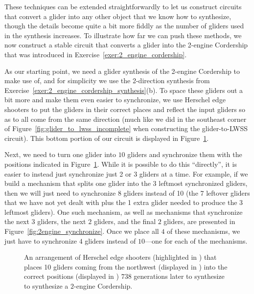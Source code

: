 These techniques can be extended straightforwardly to let us construct circuits that convert a glider into any other object that we know how to synthesize, though the details become quite a bit more fiddly as the number of gliders used in the synthesis increases. To illustrate how far we can push these methods, we now construct a stable circuit that converts a glider into the 2-engine Cordership that was introduced in Exercise~\ref{exer:2_engine_cordership}.

As our starting point, we need a glider synthesis of the 2-engine Cordership to make use of, and for simplicity we use the 2-direction synthesis from Exercise~\ref{exer:2_engine_cordership_synthesis}(b). To space these gliders out a bit more and make them even easier to synchronize, we use Herschel edge shooters to put the gliders in their correct places and reflect the input gliders so as to all come from the same direction (much like we did in the southeast corner of Figure~\ref{fig:glider_to_lwss_incomplete} when constructing the glider-to-LWSS circuit). This bottom portion of our circuit is displayed in Figure~\ref{fig:g_to_2engine_V}.

Next, we need to turn one glider into $10$ gliders and synchronize them with the positions indicated in Figure~\ref{fig:g_to_2engine_V}. While it is possible to do this ``directly'', it is easier to instead just synchronize just 2 or 3 gliders at a time. For example, if we build a mechanism that splits one glider into the 3 leftmost synchronized gliders, then we will just need to synchronize 8 gliders instead of 10 (the 7 leftover gliders that we have not yet dealt with plus the 1 extra glider needed to produce the 3 leftmost gliders). One such mechanism, as well as mechanisms that synchronize the next $3$ gliders, the next $2$ gliders, and the final $2$ gliders, are presented in Figure~\ref{fig:2engine_synchronize}. Once we place all $4$ of these mechanisms, we just have to synchronize $4$ gliders instead of $10$---one for each of the mechanisms.

\begin{figure}[!htb]
	\centering
	\caption{An arrangement of Herschel edge shooters (highlighted in ) that places 10 gliders coming from the northwest (displayed in ) into the correct positions (displayed in ) $738$ generations later to synthesize to synthesize a $2$-engine Cordership.}\label{fig:g_to_2engine_V}
\end{figure}


